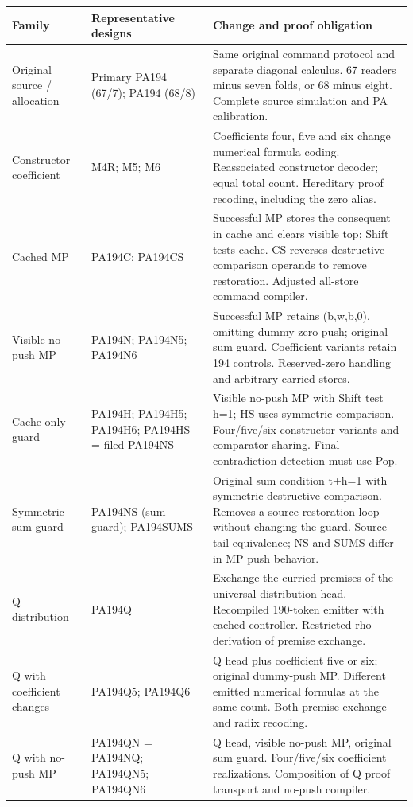 \begingroup\small
\begin{longtable}{L{30mm}L{43mm}L{72mm}}
\toprule
Family & Representative designs & Change and proof obligation\\
\midrule\endhead
Original source / allocation & Primary PA194 (67/7); PA194 (68/8) & Same original command protocol and separate diagonal calculus. 67 readers minus seven folds, or 68 minus eight. Complete source simulation and PA calibration.\\[4pt]
Constructor coefficient & M4R; M5; M6 & Coefficients four, five and six change numerical formula coding. Reassociated constructor decoder; equal total count. Hereditary proof recoding, including the zero alias.\\[4pt]
Cached MP & PA194C; PA194CS & Successful MP stores the consequent in cache and clears visible top; Shift tests cache. CS reverses destructive comparison operands to remove restoration. Adjusted all-store command compiler.\\[4pt]
Visible no-push MP & PA194N; PA194N5; PA194N6 & Successful MP retains (b,w,b,0), omitting dummy-zero push; original sum guard. Coefficient variants retain 194 controls. Reserved-zero handling and arbitrary carried stores.\\[4pt]
Cache-only guard & PA194H; PA194H5; PA194H6; PA194HS = filed PA194NS & Visible no-push MP with Shift test h=1; HS uses symmetric comparison. Four/five/six constructor variants and comparator sharing. Final contradiction detection must use Pop.\\[4pt]
Symmetric sum guard & PA194NS (sum guard); PA194SUMS & Original sum condition t+h=1 with symmetric destructive comparison. Removes a source restoration loop without changing the guard. Source tail equivalence; NS and SUMS differ in MP push behavior.\\[4pt]
Q distribution & PA194Q & Exchange the curried premises of the universal-distribution head. Recompiled 190-token emitter with cached controller. Restricted-rho derivation of premise exchange.\\[4pt]
Q with coefficient changes & PA194Q5; PA194Q6 & Q head plus coefficient five or six; original dummy-push MP. Different emitted numerical formulas at the same count. Both premise exchange and radix recoding.\\[4pt]
Q with no-push MP & PA194QN = PA194NQ; PA194QN5; PA194QN6 & Q head, visible no-push MP, original sum guard. Four/five/six coefficient realizations. Composition of Q proof transport and no-push compiler.\\[4pt]

\end{longtable}
